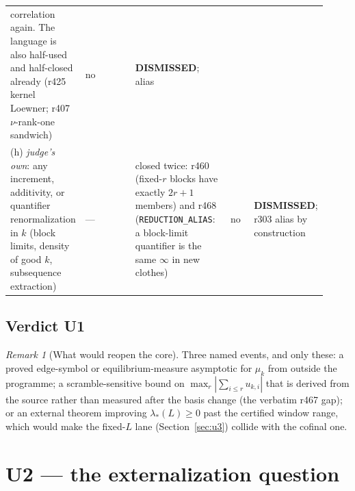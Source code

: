 \documentclass[11pt]{article}
\theoremstyle{remark}
\newtheorem{remark}{Remark}
\begin{document}
{\begin{longtable}{@{}p{0.155\linewidth}p{0.215\linewidth}p{0.315\linewidth}p{0.085\linewidth}p{0.145\linewidth}@{}}
correlation again.  The language is also half-used and half-closed
already (r425 kernel Loewner; r407 $\nu$-rank-one sandwich) &
no &
\textbf{DISMISSED}; alias\\
\addlinespace
(h) \emph{judge's own}: any increment, additivity, or quantifier
renormalization in $k$ (block limits, density of good $k$,
subsequence extraction) &
--- &
closed twice: r460 (fixed-$r$ blocks have exactly $2r+1$ members) and
r468 (\texttt{REDUCTION\_ALIAS}: a block-limit quantifier is the same
$\infty$ in new clothes) &
no &
\textbf{DISMISSED}; r303 alias by construction\\
\bottomrule
\end{longtable}}

\subsection{Verdict U1}

\noindent{}

\begin{remark}[What would reopen the core]
Three named events, and only these: a proved edge-symbol or
equilibrium-measure asymptotic for $\mu_k$ from outside the
programme; a scramble-sensitive bound on
$\max_r|\sum_{i\le r}u_{k,i}|$ that is derived from the source rather
than measured after the basis change (the verbatim r467 gap); or an
external theorem improving $\lambda_*(L)\ge0$ past the certified
window range, which would make the fixed-$L$ lane
(Section~\ref{sec:u3}) collide with the cofinal one.
\end{remark}

\section{U2 --- the externalization question}\label{sec:u2}
\end{document}
